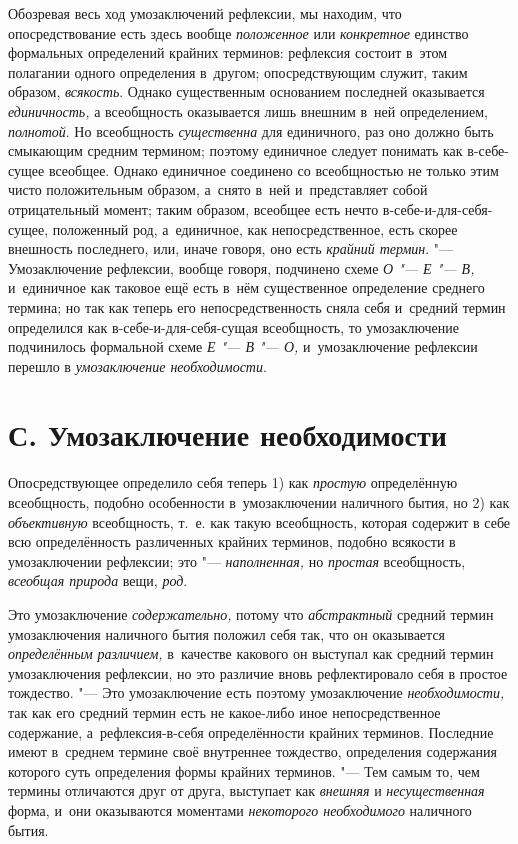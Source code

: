 Обозревая весь ход умозаключений рефлексии, мы находим, что
опосредствование есть здесь вообще
{\em положенное} или
{\em конкретное} единство
формальных определений крайних терминов: рефлексия состоит в~этом полагании
одного определения в~другом; опосредствующим служит, таким образом,
{\em всякость}. Однако
существенным основанием последней оказывается
{\em единичность,} а
всеобщность оказывается лишь внешним в~ней определением,
{\em полнотой}. Но
всеобщность {\em существенна}
для единичного, раз оно должно быть смыкающим средним
термином; поэтому единичное следует понимать как в-себе-сущее всеобщее.
Однако единичное соединено со всеобщностью не только этим чисто
положительным образом, а~снято в~ней и~представляет собой отрицательный
момент; таким образом, всеобщее есть нечто в-себе-и-для-себя-сущее,
положенный род, а~единичное, как непосредственное, есть скорее внешность
последнего, или, иначе говоря, оно есть
{\em крайний термин}. "---
Умозаключение рефлексии, вообще говоря, подчинено схеме
{\em О "--- Е "--- В,}
и~единичное как таковое ещё есть в~нём существенное
определение среднего термина; но так как теперь его непосредственность
сняла себя и~средний термин определился как
в-себе-и-для-себя-сущая всеобщность, то умозаключение
подчинилось формальной схеме {\em Е
"--- В "--- О,} и~умозаключение
рефлексии перешло в {\em умозаключение
необходимости}.

\section[С. Умозаключение необходимости]{С. Умозаключение необходимости}

Опосредствующее определило себя теперь 1) как
{\em простую}
определённую всеобщность, подобно особенности в~умозаключении
наличного бытия, но 2) как
{\em объективную}
всеобщность, т.~е. как такую всеобщность, которая содержит в
себе всю определённость различенных крайних терминов, подобно всякости в
умозаключении рефлексии; это
"--- {\em наполненная,} но
{\em простая}
всеобщность, {\em всеобщая
природа} вещи,
{\em род}.

Это умозаключение
{\em содержательно,}
потому что
{\em абстрактный} средний
термин умозаключения наличного бытия положил себя так, что он оказывается
{\em определённым различием,}
в~качестве какового он выступал как средний термин
умозаключения рефлексии, но это различие вновь рефлектировало себя в
простое тождество. "--- Это умозаключение есть поэтому
умозаключение {\em необходимости,}
так как его средний термин есть не какое-либо иное
непосредственное содержание, а~рефлексия-в-себя определённости крайних
терминов. Последние имеют в~среднем термине своё внутреннее тождество,
определения содержания которого суть определения формы крайних терминов. "---
Тем самым то, чем термины отличаются друг от друга, выступает
как {\em внешняя} и
{\em несущественная}
форма, и~они оказываются моментами
{\em некоторого необходимого}
наличного бытия.

